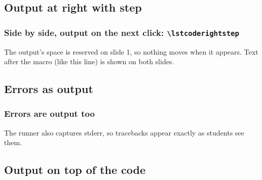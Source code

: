 \documentclass[aspectratio=169,10pt,compress]{beamer}
\begin{document}
\subsection[rightStep]{Output at right with step}




\begin{frame}[t,fragile] \frametitle{Side by side, output on the next click: \texttt{\textbackslash lstcoderightstep}}

  \vspace{0.5em}
  \small The output's space is reserved on slide 1, so nothing moves when it appears.
  Text after the macro (like this line) is shown on both slides.
\end{frame}



\subsection[error]{Errors as output}




\begin{frame}[t,fragile] \frametitle{Errors are output too}

  \small The runner also captures stderr, so tracebacks appear exactly as students see them.
\end{frame}







\subsection[onTop]{Output on top of the code}
\end{document}

